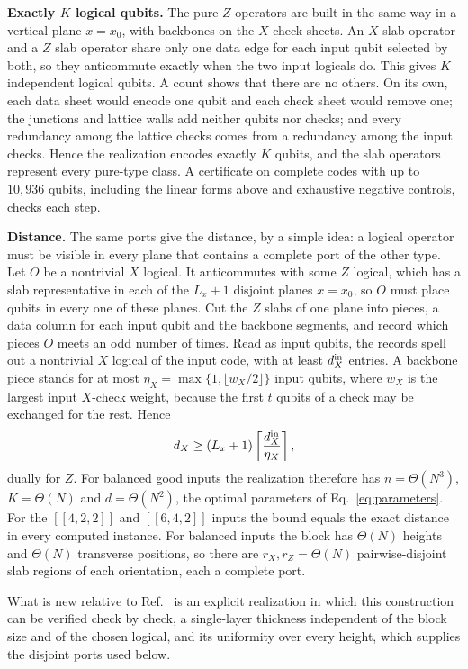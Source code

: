 \documentclass[10pt,a4paper,twocolumn]{article}
\begin{document}
\textbf{Exactly $K$ logical qubits.}  The pure-$Z$ operators are built in the
same way in a vertical plane $x=x_0$, with backbones on the $X$-check sheets.  An
$X$ slab operator and a $Z$ slab operator share only one data edge for each
input qubit selected by both, so they anticommute exactly when the two input
logicals do.  This gives $K$ independent logical qubits.  A count shows that
there are no others.  On its own, each data sheet would encode one qubit and
each check sheet would remove one; the junctions and lattice walls add neither
qubits nor checks; and every redundancy among the lattice checks comes from a
redundancy among the input checks.  Hence the realization encodes exactly $K$
qubits, and the slab operators represent every pure-type class.  A certificate
on complete codes with up to $10{,}936$ qubits, including the linear forms above
and exhaustive negative controls, checks each step.

\textbf{Distance.}  The same ports give the distance, by a simple idea: a
logical operator must be visible in every plane that contains a complete port of
the other type.  Let $O$ be a nontrivial $X$ logical.  It anticommutes with some
$Z$ logical, which has a slab representative in each of the $L_x+1$ disjoint
planes $x=x_0$, so $O$ must place qubits in every one of these planes.  Cut the
$Z$ slabs of one plane into pieces, a data column for each input qubit and the
backbone segments, and record which pieces $O$ meets an odd number of times.
Read as input qubits, the records spell out a nontrivial $X$ logical of the
input code, with at least $d_X^{\rm in}$ entries.  A backbone piece stands for
at most $\eta_X=\max\{1,\lfloor w_X/2\rfloor\}$ input qubits, where $w_X$ is the
largest input $X$-check weight, because the first $t$ qubits of a check may be
exchanged for the rest.  Hence
\begin{equation}
 d_X\ge(L_x+1)\left\lceil\frac{d_X^{\rm in}}{\eta_X}\right\rceil,
 \label{eq:distance}
\end{equation}
dually for $Z$.  For balanced good inputs the realization therefore has
$n=\Theta(N^3)$, $K=\Theta(N)$ and $d=\Theta(N^2)$, the optimal parameters of
Eq.~\eqref{eq:parameters}.  For the $[[4,2,2]]$ and $[[6,4,2]]$ inputs the bound
equals the exact distance in every computed instance.  For balanced inputs the
block has $\Theta(N)$ heights and $\Theta(N)$ transverse positions, so there are
$r_X,r_Z=\Theta(N)$ pairwise-disjoint slab regions of each orientation, each a
complete port.

What is new relative to Ref.~\cite{WilliamsonBaspinLayerCodes} is an explicit
realization in which this construction can be verified check by check, a
single-layer thickness independent of the block size and of the chosen logical,
and its uniformity over every height, which supplies the disjoint ports used
below.
\end{document}
